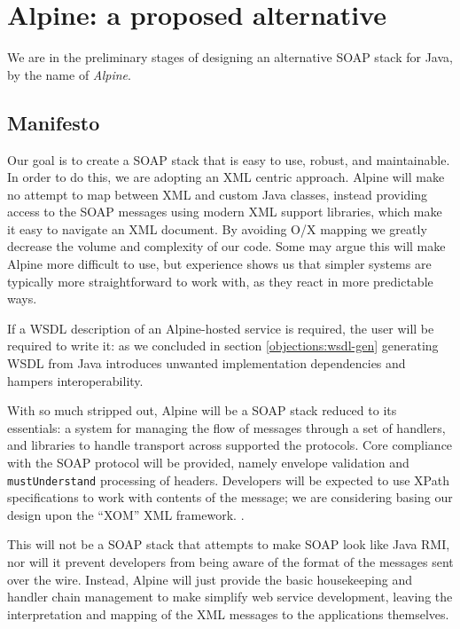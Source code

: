 \section{Alpine: a proposed alternative}
\label{alpine}

We are in the preliminary stages of designing an alternative SOAP
stack for Java, by the name of \emph{Alpine}.

\subsection{Manifesto}
\label{alpine:manifesto}

Our goal is to create a SOAP stack that is easy to use, robust, and
maintainable. In order to do this, we are adopting an XML centric
approach. Alpine will make no attempt to map between XML and custom
Java classes, instead providing access to the SOAP messages using
modern XML support libraries, which make it easy to navigate an XML
document. By avoiding O/X mapping we greatly decrease the volume and
complexity of our code. Some may argue this will make Alpine more
difficult to use, but experience shows us that simpler systems are
typically more straightforward to work with, as they react in more
predictable ways.

If a WSDL description of an Alpine-hosted service is required, the
user will be required to write it: as we concluded in section
\ref{objections:wsdl-gen} generating WSDL from Java introduces
unwanted implementation dependencies and hampers interoperability.

With so much stripped out, Alpine will be a SOAP stack reduced to its
essentials: a system for managing the flow of messages through a set
of handlers, and libraries to handle transport across supported the
protocols. Core compliance with the SOAP protocol will be provided,
namely envelope validation and \verb|mustUnderstand| processing of
headers. Developers will be expected to use XPath specifications to
work with contents of the message; we are considering basing our
design upon the ``XOM'' XML framework.  \cite{harold:xom}.

This will not be a SOAP stack that attempts to make SOAP look like
Java RMI, nor will it prevent developers from being aware of the
format of the messages sent over the wire. Instead, Alpine will just
provide the basic housekeeping and handler chain management to make
simplify web service development, leaving the interpretation and
mapping of the XML messages to the applications themselves.

